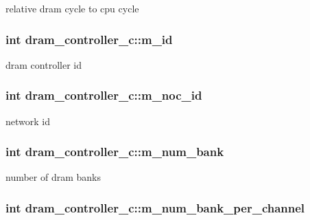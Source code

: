 \label{classdram__controller__c_a33c4f9781f46ee69715f6ab54b4eec46}
relative dram cycle to cpu cycle \hypertarget{classdram__controller__c_a7b3d7fc2ce0d87fa1ff76b4a6ba607a1}{
\subsubsection[{m\_\-id}]{\setlength{\rightskip}{0pt plus 5cm}int {\bf dram\_\-controller\_\-c::m\_\-id}}}
\label{classdram__controller__c_a7b3d7fc2ce0d87fa1ff76b4a6ba607a1}
dram controller id \hypertarget{classdram__controller__c_a86f6215cf918c0a83ca2180b8dcea67c}{
\subsubsection[{m\_\-noc\_\-id}]{\setlength{\rightskip}{0pt plus 5cm}int {\bf dram\_\-controller\_\-c::m\_\-noc\_\-id}}}
\label{classdram__controller__c_a86f6215cf918c0a83ca2180b8dcea67c}
network id \hypertarget{classdram__controller__c_a98fd7fb6cf778ca6bba63a861b551bda}{
\subsubsection[{m\_\-num\_\-bank}]{\setlength{\rightskip}{0pt plus 5cm}int {\bf dram\_\-controller\_\-c::m\_\-num\_\-bank}}}
\label{classdram__controller__c_a98fd7fb6cf778ca6bba63a861b551bda}
number of dram banks \hypertarget{classdram__controller__c_ac3907c9a15aa3131c9aee34313a28e37}{
\subsubsection[{m\_\-num\_\-bank\_\-per\_\-channel}]{\setlength{\rightskip}{0pt plus 5cm}int {\bf dram\_\-controller\_\-c::m\_\-num\_\-bank\_\-per\_\-channel}}}
